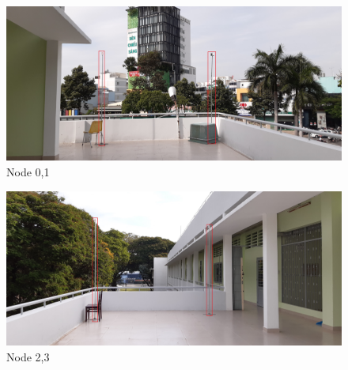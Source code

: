 \documentclass[\main/main.tex]{subfiles}
\begin{document}

\begin{figure}[H]      
    \centering
    \includegraphics[width=1\textwidth]{arena_01.jpg}
    \caption{Node 0,1}
    \label{fig:node_0_1}
\end{figure}

\begin{figure}[H]      
    \centering
    \includegraphics[width=1\textwidth]{arena_02.jpg}
    \caption{Node 2,3}
    \label{fig:node_2_3}
\end{figure}

\end{document}
